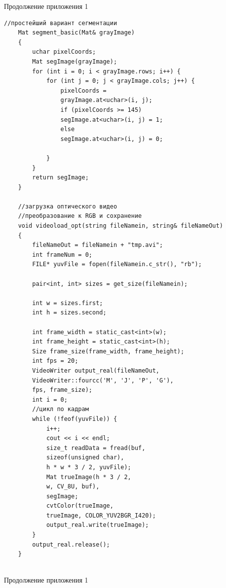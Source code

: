 \documentclass[14pt, a4paper]{extreport}
\begin{document}
\noindent Продолжение приложения 1
\begin{Verbatim}[fontseries=c, fontsize=\fontsize{10pt}{12pt}\selectfont]
	//простейший вариант сегментации
	Mat segment_basic(Mat& grayImage)
	{
		uchar pixelCoords;
		Mat segImage(grayImage);
		for (int i = 0; i < grayImage.rows; i++) {
			for (int j = 0; j < grayImage.cols; j++) {
				pixelCoords = 
				grayImage.at<uchar>(i, j);
				if (pixelCoords >= 145)
				segImage.at<uchar>(i, j) = 1;
				else
				segImage.at<uchar>(i, j) = 0;
				
			}
		}
		return segImage;
	}
	
	//загрузка оптического видео
	//преобразование к RGB и сохранение
	void videoload_opt(string fileNamein, string& fileNameOut)
	{
		fileNameOut = fileNamein + "tmp.avi";
		int frameNum = 0;
		FILE* yuvFile = fopen(fileNamein.c_str(), "rb");
		
		pair<int, int> sizes = get_size(fileNamein);
		
		int w = sizes.first;
		int h = sizes.second;
		
		int frame_width = static_cast<int>(w);
		int frame_height = static_cast<int>(h);
		Size frame_size(frame_width, frame_height);
		int fps = 20;
		VideoWriter output_real(fileNameOut, 
		VideoWriter::fourcc('M', 'J', 'P', 'G'),
		fps, frame_size);
		int i = 0;
		//цикл по кадрам
		while (!feof(yuvFile)) {
			i++;
			cout << i << endl;
			size_t readData = fread(buf,
			sizeof(unsigned char),
			h * w * 3 / 2, yuvFile);
			Mat trueImage(h * 3 / 2,
			w, CV_8U, buf),
			segImage;
			cvtColor(trueImage,
			trueImage, COLOR_YUV2BGR_I420);
			output_real.write(trueImage);
		}
		output_real.release();
	}
	
\end{Verbatim}
\noindent Продолжение приложения 1
\end{document}
